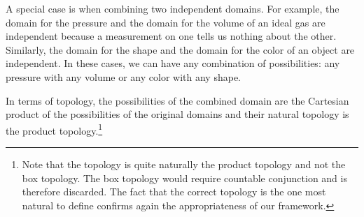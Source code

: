 A special case is when combining two independent domains. For example, the domain for the pressure and the domain for the volume of an ideal gas are independent because a measurement on one tells us nothing about the other. Similarly, the domain for the shape and the domain for the color of an object are independent. In these cases, we can have any combination of possibilities: any pressure with any volume or any color with any shape.

In terms of topology, the possibilities of the combined domain are the Cartesian product of the possibilities of the original domains and their natural topology is the product topology.\footnote{Note that the topology is quite naturally the product topology and not the box topology. The box topology would require countable conjunction and is therefore discarded. The fact that the correct topology is the one most natural to define confirms again the appropriateness of our framework.}

